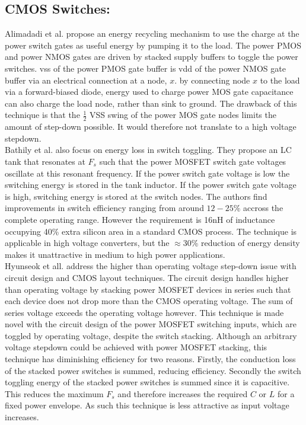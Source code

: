 \documentclass[letterpaper,twocolumn,10pt]{article}
\begin{document}
\subsection{CMOS Switches: }Alimadadi et al.\cite{Alimadadi2008} propose an energy recycling mechanism to use the charge at the power switch gates as useful energy by pumping it to the load. The power PMOS and power NMOS gates are driven by stacked supply buffers to toggle the power switches. vss of the power PMOS gate buffer is vdd of the power NMOS gate buffer via an electrical connection at a node, $x$. by connecting node $x$ to the load via a forward-biased diode, energy used to charge power MOS gate capacitance can also charge the load node, rather than sink to ground. The drawback of this technique is that the $\frac{1}{2}$ VSS swing of the power MOS gate nodes limits the amount of step-down possible. It would therefore not translate to a high voltage stepdown.\\
\indent Bathily et al.\cite{Bathily2012} also focus on energy loss in switch toggling. They propose an LC tank that resonates at $F_s$ such that the power MOSFET switch gate voltages oscillate at this resonant frequency. If the power switch gate voltage is low the switching energy is stored in the tank inductor. If the power switch gate voltage is high, switching energy is stored at the switch nodes. The authors find improvements in switch efficiency ranging from around $12 - 25\%$ accross the complete operating range. However the requirement is 16nH of inductance occupying 40\% extra silicon area in a standard CMOS process. The technique is applicable in high voltage converters, but the $\approx$30\% reduction of energy density makes it unattractive in medium to high power applications.\\
\indent Hyunseok et all.\cite{Hyunseok2012} address the higher than operating voltage step-down issue with circuit design and CMOS layout techniques. The circuit design handles higher than operating voltage by stacking power MOSFET devices in series such that each device does not drop more than the CMOS operating voltage. The sum of series voltage exceeds the operating voltage however. This technique is made novel with the circuit design of the power MOSFET switching inputs, which are toggled by operating voltage, despite the switch stacking. Although an arbitrary voltage stepdown could be achieved with power MOSFET stacking, this technique has diminishing efficiency for two reasons. Firstly, the conduction loss of the stacked power switches is summed, reducing efficiency. Secondly the switch toggling energy of the stacked power switches is summed since it is capacitive. This reduces the maximum $F_s$ and therefore increases the required $C$ or $L$ for a fixed power envelope. As such this technique is less attractive as input voltage increases.\\
\end{document}
